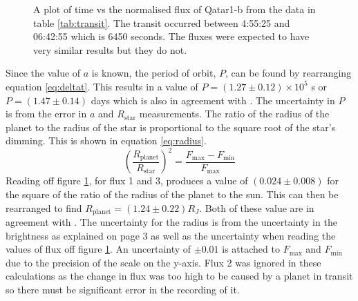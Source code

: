 \documentclass[10pt]{article}
\begin{document}
\begin{figure}[!htb]
	\centering
	
	\caption{A plot of time vs the normalised flux of Qatar1-b from the data in table \ref{tab:transit}. The transit occurred between 4:55:25 and 06:42:55 which is 6450 seconds. The fluxes were expected to have very similar results but they do not.}
	\label{fig:flux}
\end{figure}
\pagebreak
\noindent Since the value of $a$ is known, the period of orbit, $P$, can be found by rearranging equation \ref{eq:deltat}. This results in a value of $P = (1.27 \pm 0.12) \times 10^5$ s or $P = (1.47\pm 0.14)$ days which is also in agreement with \cite{Alsubai_2011}. The uncertainty in $P$ is from the error in $a$ and $R_{\text{star}}$ measurements. The ratio of the radius of the planet to the radius of the star is proportional to the square root of the star’s dimming. This is shown in equation \ref{eq:radius}. 
\begin{equation}
	\left( \frac{R_{\text{planet}}}{R_{\text{star}}} \right) ^ 2 = \frac{F_{\text{max}} - F_{\text{min}}}{F_{\text{max}}}
	\label{eq:radius}
\end{equation}
Reading off figure \ref{fig:flux}, for flux 1 and 3, produces a value of $(0.024\pm 0.008)$ for the square of the ratio of the radius of the planet to the sun. This can then be rearranged to find $R_{\text{planet}} = (1.24\pm 0.22)R_J$. Both of these value are in agreement with \cite{Alsubai_2011}. The uncertainty for the radius is from the uncertainty in the brightness as explained on page 3 as well as the uncertainty when reading the values of flux off figure \ref{fig:flux}. An uncertainty of $\pm 0.01$ is attached to $F_{\text{max}}$ and $F_{\text{min}}$ due to the precision of the scale on the y-axis. Flux 2 was ignored in these calculations as the change in flux was too high to be caused by a planet in transit so there must be significant error in the recording of it. \\
\end{document}
